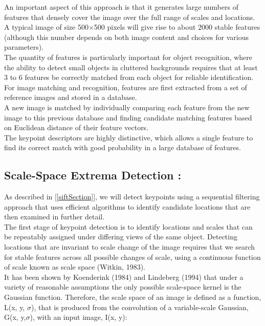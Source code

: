 An important aspect of this approach is that it generates large numbers of features that
densely cover the image over the full range of scales and locations.\\ A typical image of size
500$\times$500 pixels will give rise to about 2000 stable features (although this number depends
on both image content and choices for various parameters).\\ The quantity of features is
particularly important for object recognition, where the ability to detect small objects in
cluttered backgrounds requires that at least 3 to 6 features be correctly matched from each
object for reliable identiﬁcation.
For image matching and recognition, features are first extracted from a set of reference
images and stored in a database.\\ A new image is matched by individually comparing
each feature from the new image to this previous database and finding candidate matching
features based on Euclidean distance of their feature vectors.\\
The keypoint descriptors are highly distinctive, which allows a single feature to find its
correct match with good probability in a large database of features. \\





\subsection{Scale-Space Extrema Detection :}
As described in [\ref{siftSection}], we will detect keypoints using a sequential filtering approach
that uses efficient algorithms to identify candidate locations that are then examined
in further detail.\\ The first stage of keypoint detection is to identify locations and scales that
can be repeatably assigned under differing views of the same object. Detecting locations
that are invariant to scale change of the image requires that we search for stable features
across all possible changes of scale, using a continuous function of scale known as scale
space (Witkin, 1983).\\
It has been shown by Koenderink (1984) and Lindeberg (1994) that under a variety of reasonable assumptions the only possible scale-space kernel is the Gaussian function.
Therefore, the scale space of an image is defined as a function, L(x, y, $\sigma$), that is produced
from the convolution of a variable-scale Gaussian, G(x, y,$\sigma$), with an input image, I(x, y):\\

